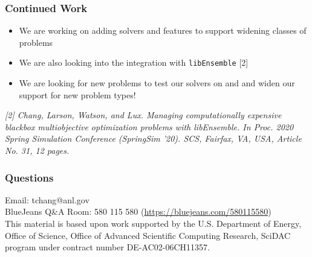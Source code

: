 \documentclass[aspectratio=169]{beamer}
\begin{document}
\begin{frame}\frametitle{Continued Work}
\begin{itemize}
\item We are working on adding solvers and features to support widening classes
of problems
\item We are also looking into the integration with {\tt libEnsemble} [2]
\item We are looking for new problems to test our solvers on and
and widen our support for new problem types!
\end{itemize}
\medskip
{\tiny\it [2]
Chang, Larson, Watson, and Lux.
Managing computationally expensive blackbox multiobjective optimization
problems with libEnsemble.
In Proc. 2020 Spring Simulation Conference (SpringSim '20).
SCS, Fairfax, VA, USA, Article No. 31, 12 pages.\\
}
\end{frame}

\begin{frame}\frametitle{Questions}
\begin{center}
{\huge
Email: tchang@anl.gov\\
\bigskip
BlueJeans Q\&A Room:  580 115 580
{\large (\url{https://bluejeans.com/580115580})}}\\
\bigskip
\bigskip
\bigskip
{\small This material is based upon work supported by the U.S. Department of Energy, Office of Science, Office of Advanced Scientific Computing Research, SciDAC program under contract number DE-AC02-06CH11357.}
\end{center}
\end{frame}
\end{document}

